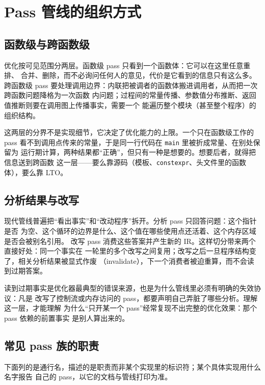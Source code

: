 \documentclass[12pt,a4paper,fontset=fandol]{ctexbook}
\newcommand{\Tp}[1]{\texttt{#1}}
\newcommand{\Tool}[1]{\texttt{#1}}
\newcommand{\Mx}[1]{\textsf{#1}}
\begin{document}
\section{Pass 管线的组织方式}\label{sec:cl05-passorg}

\subsection{函数级与跨函数级}\label{sec:cl05-scope}

优化按可见范围分两层。函数级 \Mx{pass} 只看到一个函数体：它可以在这里任意重排、
合并、删除，而不必询问任何人的意见，代价是它看到的信息只有这么多。跨函数级 \Mx{pass}
要处理调用边界：内联把被调者的函数体搬进调用者，从而把一次跨函数问题降格为一次函数
内问题；过程间的常量传播、参数值分布推断、返回值推断则要在调用图上传播事实，需要一个
能遍历整个模块（甚至整个程序）的组织结构。

这两层的分界不是实现细节，它决定了优化能力的上限。一个只在函数级工作的 \Mx{pass}
看不到调用点传来的常量，于是同一行代码在 \Tool{main} 里被折成常量、在别处保留为
运行期计算，两种结果都“正确”，但只有一种是想要的。想要后者，就得把信息送到跨函数
这一层——要么靠源码（模板、\Tp{constexpr}、头文件里的函数体），要么靠 \Mx{LTO}。

\subsection{分析结果与改写}\label{sec:cl05-analysis}

现代管线普遍把“看出事实”和“改动程序”拆开。分析 \Mx{pass} 只回答问题：这个指针是否
为空、这个循环的边界是什么、这个值在哪些使用点还活着、这个内存区域是否会被别名引用。
改写 \Mx{pass} 消费这些答案并产生新的 \Mx{IR}。这样切分带来两个直接好处：同一个事实在
一轮里的多个改写之间复用；改写之后一旦程序结构变了，相关分析结果被显式作废
（invalidate），下一个消费者被迫重算，而不会读到过期答案。

读到过期事实是优化器最典型的错误来源，也是为什么管线里必须有明确的失效协议：凡是
改写了控制流或内存访问的 \Mx{pass}，都要声明自己弄脏了哪些分析。理解这一层，才能理解
为什么“只开某一个 \Mx{pass}”经常复现不出完整的优化效果：那个 \Mx{pass} 依赖的前置事实
是别人算出来的。

\subsection{常见 pass 族的职责}\label{sec:cl05-passlist}

下面列的是通行名，描述的是职责而非某个实现里的标识符；某个具体实现用什么名字报告
自己的 \Mx{pass}，以它的文档与管线打印为准。
\end{document}

